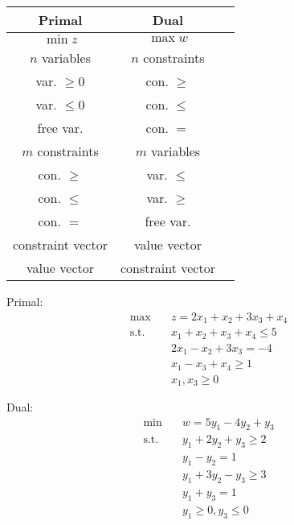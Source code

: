 \begin{minipage}{0.25\textwidth}
\begin{tabular}{|c|c|c|}
  \hline
  Primal & Dual \\
  \hline
  $\min z$ & $\max w$ \\
  $n$ variables & $n$ constraints \\
  var. $ \geq 0$ & con. $ \geq$ \\
  var. $ \leq 0$ & con. $ \leq$ \\
  free var. & con. $ = $ \\
  $m$ constraints & $m$ variables \\
  con. $ \geq $ & var. $\leq $ \\
  con. $ \leq $ & var. $\geq $ \\
  con. $ = $ & free var. \\
  constraint vector & value vector \\
  value vector & constraint vector \\
  \hline
\end{tabular}
\end{minipage}
\begin{minipage}{0.22\textwidth}
Primal:
\begin{align*}
\max \quad & z = 2x_1 + x_2 + 3x_3 + x_4 \\
\text{s.t.} \quad & x_1 + x_2 + x_3 + x_4 \leq 5 \\
& 2x_1 - x_2 + 3x_3 = -4 \\
& x_1 - x_3 + x_4 \geq 1 \\
& x_1, x_3 \geq 0
\end{align*}

Dual:
\begin{align*}
\min \quad & w = 5y_1 - 4y_2 + y_3 \\
\text{s.t.} \quad & y_1 + 2y_2 + y_3 \geq 2 \\
& y_1 - y_2 = 1 \\
& y_1 + 3y_2 - y_3 \geq 3 \\
& y_1 + y_3  = 1 \\
& y_1 \geq 0, y_3 \leq 0
\end{align*}
\end{minipage}
